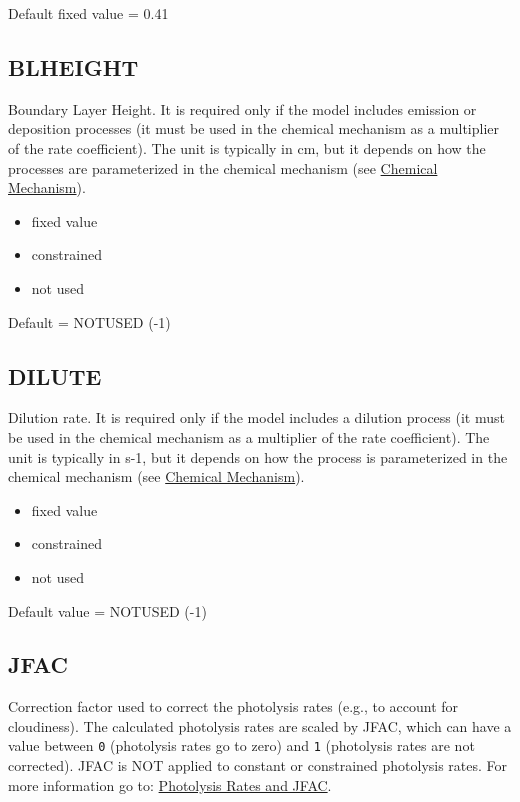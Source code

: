 Default fixed value = 0.41

\subsection{BLHEIGHT} \label{subsec:blheight}

Boundary Layer Height. It is required only if the model includes
emission or deposition processes (it must be used in the chemical
mechanism as a multiplier of the rate coefficient). The unit is
typically in cm, but it depends on how the processes are parameterized
in the chemical mechanism (see \hyperref[sec:chemical-mechanism]{Chemical
  Mechanism}).

\begin{itemize}
\item fixed value
\item constrained
\item not used
\end{itemize}

Default = NOTUSED (-1)

\subsection{DILUTE} \label{subsec:dilute}

Dilution rate. It is required only if the model includes a dilution
process (it must be used in the chemical mechanism as a multiplier of
the rate coefficient). The unit is typically in s-1, but it depends on
how the process is parameterized in the chemical mechanism (see
\hyperref[sec:chemical-mechanism]{Chemical Mechanism}).

\begin{itemize}
\item fixed value
\item constrained
\item not used
\end{itemize}

Default value = NOTUSED (-1)

\subsection{JFAC} \label{subsec:jfac}

Correction factor used to correct the photolysis rates (e.g., to
account for cloudiness). The calculated photolysis rates are scaled by
JFAC, which can have a value between \texttt{0} (photolysis rates go
to zero) and \texttt{1} (photolysis rates are not corrected). JFAC is
NOT applied to constant or constrained photolysis rates. For more
information go to: \hyperref[sec:photolysis-rates]{Photolysis Rates and
  JFAC}.

